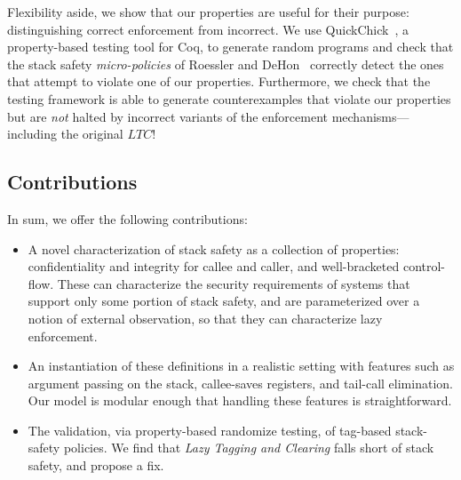 \documentclass[10pt,conference]{ieeetran}%
\theoremstyle{definition}
\begin{document}

Flexibility aside, we show that our properties are useful for their purpose:
distinguishing correct enforcement from incorrect. We use
QuickChick~\cite{Denes:VSL2014,Pierce:SF4}, a property-based testing
tool for Coq, to generate random programs and check that the
stack safety {\em micro-policies} of Roessler and DeHon~\cite{DBLP:conf/sp/RoesslerD18}
correctly detect the ones that attempt to violate one of our properties. Furthermore, we
check that the testing framework is able to generate counterexamples
that violate our properties but are \emph{not} halted by incorrect
variants of the enforcement mechanisms---including the original \(LTC\)!

\subsection{Contributions}

In sum, we offer the following contributions:

\begin{itemize}
\item A novel characterization of stack safety as a collection of properties:
  confidentiality and integrity for callee and caller, and well-bracketed
  control-flow. These can characterize the security requirements of systems
  that support only some portion of stack safety, and are
  parameterized over a notion of external observation, so that they can characterize
  lazy enforcement.
\item An instantiation of these definitions in a realistic
  setting with features such as argument passing
  on the stack, callee-saves registers, and tail-call elimination.
  Our model is modular enough that handling these features is straightforward.
\item The validation, via property-based randomize testing, of tag-based
  stack-safety policies. We find that \emph{Lazy Tagging and Clearing}
  falls short of stack safety, and propose a fix.
\end{itemize}
\end{document}
